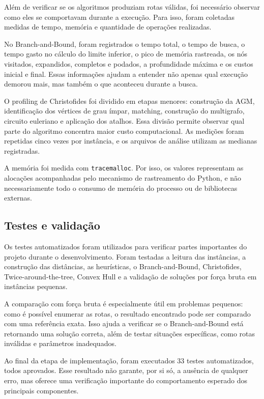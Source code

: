 \documentclass[12pt]{article}
\begin{document}
Além de verificar se os algoritmos produziam rotas válidas, foi necessário observar como eles se comportavam durante a execução. Para isso, foram coletadas medidas de tempo, memória e quantidade de operações realizadas.

No Branch-and-Bound, foram registrados o tempo total, o tempo de busca, o tempo gasto no cálculo do limite inferior, o pico de memória rastreada, os nós visitados, expandidos, completos e podados, a profundidade máxima e os custos inicial e final. Essas informações ajudam a entender não apenas qual execução demorou mais, mas também o que aconteceu durante a busca.

O profiling de Christofides foi dividido em etapas menores: construção da AGM, identificação dos vértices de grau ímpar, matching, construção do multigrafo, circuito euleriano e aplicação dos atalhos. Essa divisão permite observar qual parte do algoritmo concentra maior custo computacional. As medições foram repetidas cinco vezes por instância, e os arquivos de análise utilizam as medianas registradas.

A memória foi medida com \texttt{tracemalloc}. Por isso, os valores representam as alocações acompanhadas pelo mecanismo de rastreamento do Python, e não necessariamente todo o consumo de memória do processo ou de bibliotecas externas.

\subsection{Testes e validação}

Os testes automatizados foram utilizados para verificar partes importantes do projeto durante o desenvolvimento. Foram testadas a leitura das instâncias, a construção das distâncias, as heurísticas, o Branch-and-Bound, Christofides, Twice-around-the-tree, Convex Hull e a validação de soluções por força bruta em instâncias pequenas.

A comparação com força bruta é especialmente útil em problemas pequenos: como é possível enumerar as rotas, o resultado encontrado pode ser comparado com uma referência exata. Isso ajuda a verificar se o Branch-and-Bound está retornando uma solução correta, além de testar situações específicas, como rotas inválidas e parâmetros inadequados.

Ao final da etapa de implementação, foram executados 33 testes automatizados, todos aprovados. Esse resultado não garante, por si só, a ausência de qualquer erro, mas oferece uma verificação importante do comportamento esperado dos principais componentes.
\end{document}

